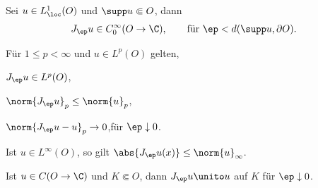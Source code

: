 \begin{prop}
\label{prop:7.45}
\begin{propenum}
\item\label{prop:7.45:1} Sei $u\in L^1_\loc(O)$ und $\supp u \Subset
O$, dann
\begin{align*}
J_\ep u \in C_0^\infty(O\to\C),\qquad \text{für } \ep < d(\supp u,\partial
O).
\end{align*}
\item\label{prop:7.45:2} Für $1\le p <\infty$ und $u\in L^p(O)$ gelten,
\begin{defnenum}
\item $J_\ep u \in L^p(O)$,
\item $\norm{J_\ep u}_p \le \norm{u}_p$,
\item $\norm{J_\ep u - u}_p \to 0$,\quad für $\ep \downarrow 0$.
\end{defnenum}
\item\label{prop:7.45:3} Ist $u\in L^\infty(O)$, so gilt $\abs{J_\ep
u(x)}\le \norm{u}_\infty$.
\item\label{prop:7.45:4} Ist $u\in C(O\to\C)$ und $K\Subset O$, dann $J_\ep u
\unito u$ auf $K$ für $\ep\downarrow 0$.\fishhere
\end{propenum}
\end{prop}
